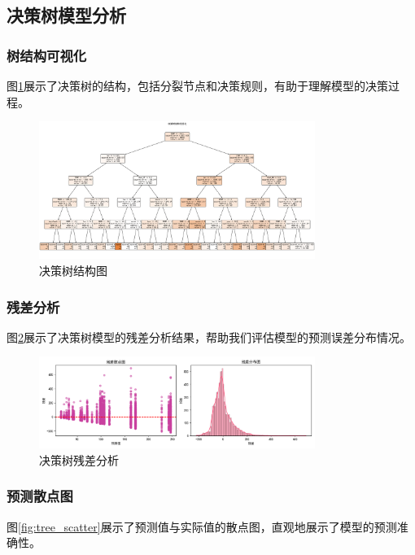 \subsection{决策树模型分析}
\subsubsection{树结构可视化}
图\ref{fig:tree_struct}展示了决策树的结构，包括分裂节点和决策规则，有助于理解模型的决策过程。

\begin{figure}[H]
    \centering
    \includegraphics[width=0.8\textwidth]{images/decision_tree/tree_structure}
    \caption{决策树结构图}
    \label{fig:tree_struct}
\end{figure}

\subsubsection{残差分析}
图\ref{fig:tree_resid}展示了决策树模型的残差分析结果，帮助我们评估模型的预测误差分布情况。

\begin{figure}[H]
    \centering
    \includegraphics[width=0.8\textwidth]{images/decision_tree/residuals_analysis}
    \caption{决策树残差分析}
    \label{fig:tree_resid}
\end{figure}

\subsubsection{预测散点图}
图\ref{fig:tree_scatter}展示了预测值与实际值的散点图，直观地展示了模型的预测准确性。

